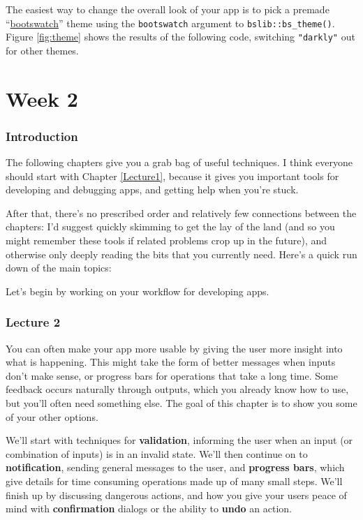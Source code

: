 \documentclass[
]{article}
\begin{document}
The easiest way to change the overall look of your app is to pick a premade ``\href{https://bootswatch.com}{bootswatch}'' theme using the \texttt{bootswatch} argument to \texttt{bslib::bs\_theme()}.
Figure \ref{fig:theme} shows the results of the following code, switching \texttt{"darkly"} out for other themes.

\hypertarget{part-week-2}{%
\part*{Week 2}\label{part-week-2}}

\hypertarget{week2-intro}{%
\section*{Introduction}\label{week2-intro}}

The following chapters give you a grab bag of useful techniques.
I think everyone should start with Chapter \ref{Lecture1}, because it gives you important tools for developing and debugging apps, and getting help when you're stuck.

After that, there's no prescribed order and relatively few connections between the chapters: I'd suggest quickly skimming to get the lay of the land (and so you might remember these tools if related problems crop up in the future), and otherwise only deeply reading the bits that you currently need.
Here's a quick run down of the main topics:

Let's begin by working on your workflow for developing apps.

\hypertarget{lecture2}{%
\section{Lecture 2}\label{lecture2}}

You can often make your app more usable by giving the user more insight into what is happening.
This might take the form of better messages when inputs don't make sense, or progress bars for operations that take a long time.
Some feedback occurs naturally through outputs, which you already know how to use, but you'll often need something else.
The goal of this chapter is to show you some of your other options.

We'll start with techniques for \textbf{validation}, informing the user when an input (or combination of inputs) is in an invalid state.
We'll then continue on to \textbf{notification}, sending general messages to the user, and \textbf{progress bars}, which give details for time consuming operations made up of many small steps.
We'll finish up by discussing dangerous actions, and how you give your users peace of mind with \textbf{confirmation} dialogs or the ability to \textbf{undo} an action.
\end{document}

